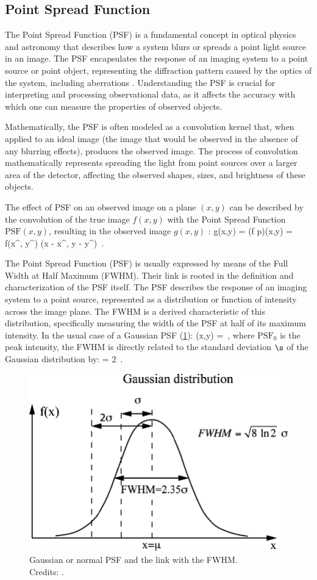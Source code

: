 \subsection{Point Spread Function}
\label{subsec:psf}
The Point Spread Function (PSF) is a fundamental concept in optical physics and astronomy that describes how a system blurs or spreads a point light source in an image. The PSF encapsulates the response of an imaging system to a point source or point object, representing the diffraction pattern caused by the optics of the system, including aberrations \citep{bovik_handbook_2005}. Understanding the PSF is crucial for interpreting and processing observational data, as it affects the accuracy with which one can measure the properties of observed objects.

Mathematically, the PSF is often modeled as a convolution kernel that, when applied to an ideal image (the image that would be observed in the absence of any blurring effects), produces the observed image. The process of convolution mathematically
represents spreading the light from point sources over a larger area of the detector, affecting the observed shapes, sizes, and brightness of these objects.

The effect of PSF on an observed image on a plane $(x,y)$ can be described by the convolution of the true image $f(x, y)$ with the Point Spread Function $\mathrm{PSF}(x,y)$, resulting in the observed image $g(x,y)$ \citep{howell_handbook_2006}:
\be
\label{eq:psf}
g(x,y) = (f \ast p)(x,y) = \iint f(x^\prime, y^\prime) (x - x^\prime, y - y^\prime)   \,.
\ee


The Point Spread Function (PSF) is usually expressed by means of the Full Width at Half Maximum (FWHM). Their link is rooted in the definition and characterization of the PSF itself. The PSF describes the response of an imaging system to a point source, represented as a distribution or function of intensity across the image plane. The FWHM is a derived characteristic of this distribution, specifically measuring the width of the PSF at half of its maximum intensity.
In the usual case of a Gaussian PSF (\cref{fig:fwhm}):
\be
\label{eq:gauss_psf}
(x,y) =   \,,
\ee
where $\mathrm{PSF_0}$ is the peak intensity, the FWHM is directly related to the standard deviation $\s$ of the Gaussian distribution by:
\be
\label{eq:fwhm}
 = 2  \s \,.
\ee

\begin{figure}
    \centering
    \includegraphics[width=0.6\linewidth]{img//chapter4/fwhm.png}
    \caption[Gaussian PSF and FWHM]{Gaussian or normal PSF and the link with the FWHM.\\\small{Credits: \cite{tavernier_experimental_2010}.}}
    \label{fig:fwhm}
\end{figure}